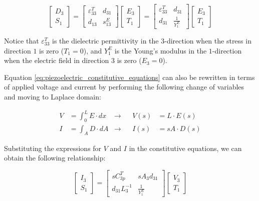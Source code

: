 \begin{equation}
    \begin{bmatrix}
        D_3 \\
        S_1
    \end{bmatrix} =
    \begin{bmatrix}
        \varepsilon_{33}^T & d_{31}   \\
        d_{13}             & s_{13}^E
    \end{bmatrix}
    \begin{bmatrix}
        E_3 \\
        T_1
    \end{bmatrix} =
    \begin{bmatrix}
        \varepsilon_{33}^T & d_{31}          \\
        d_{31}             & \frac{1}{Y_1^E}
    \end{bmatrix}
    \begin{bmatrix}
        E_3 \\
        T_1
    \end{bmatrix}
    \label{eq:piezoelectric_constitutive_equations}
\end{equation}

Notice that $\varepsilon_{33}^T$ is the dielectric permittivity in the $3$-direction when the stress in direction $1$ is zero ($T_1 = 0$), and $Y_1^E$ is the Young's modulus in the $1$-direction when the electric field in direction $3$ is zero ($E_3 = 0$).

Equation \ref{eq:piezoelectric_constitutive_equations} can also be rewritten in terms of applied voltage and current by performing the following change of variables and moving to Laplace domain:

\begin{equation}
    \begin{aligned}
        V & = \int_{0}^{L} E \cdot dx & \rightarrow &  & V(s) & = L \cdot E(s)  \\
        I & = \int_A D \cdot dA       & \rightarrow &  & I(s) & = sA \cdot D(s)
    \end{aligned}
\end{equation}

Substituting the expressions for $V$ and $I$ in the constitutive equations, we can obtain the following relationship:

\begin{equation}
    \begin{bmatrix}
        I_3 \\
        S_1
    \end{bmatrix} =
    \begin{bmatrix}
        sC_{3p}^T       & sA_3 d_{31}     \\
        d_{31} L_3^{-1} & \frac{1}{Y_1^E}
    \end{bmatrix}
    \begin{bmatrix}
        V_3 \\
        T_1
    \end{bmatrix}
    \label{eq:piezoelectric_constitutive_equations_volt_current}
\end{equation}

